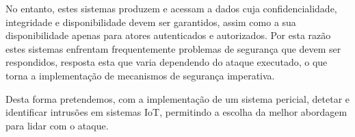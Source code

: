 No entanto, estes sistemas produzem e acessam a dados cuja confidencialidade, integridade e disponibilidade devem ser garantidos, assim como a sua disponibilidade apenas para atores autenticados e autorizados. Por esta razão estes sistemas enfrentam frequentemente problemas de segurança que devem ser respondidos, resposta esta que varia dependendo do ataque executado, o que torna a implementação de mecanismos de segurança imperativa.

Desta forma pretendemos, com a implementação de um sistema pericial, detetar e identificar intrusões em sistemas IoT, permitindo a escolha da melhor abordagem para lidar com o ataque.





